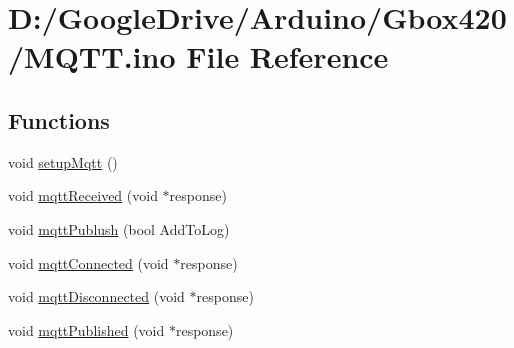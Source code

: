 \hypertarget{_m_q_t_t_8ino}{}\section{D\+:/\+Google\+Drive/\+Arduino/\+Gbox420/\+M\+Q\+TT.ino File Reference}
\label{_m_q_t_t_8ino}
\subsection*{Functions}
\begin{DoxyCompactItemize}
\item 
void \mbox{\hyperlink{_m_q_t_t_8ino_ad05a6aa6821baf0d8fe74cf150c3c57c}{setup\+Mqtt}} ()
\item 
void \mbox{\hyperlink{_m_q_t_t_8ino_a5817593b2815aca99b49db41903204d3}{mqtt\+Received}} (void $\ast$response)
\item 
void \mbox{\hyperlink{_m_q_t_t_8ino_ac3c091acc43bad71dff31c5b163db0d6}{mqtt\+Publush}} (bool Add\+To\+Log)
\item 
void \mbox{\hyperlink{_m_q_t_t_8ino_a01bcd10c2afc9c7b39c5da283353945b}{mqtt\+Connected}} (void $\ast$response)
\item 
void \mbox{\hyperlink{_m_q_t_t_8ino_acb866f89716f9272ccada4f9c9c7d09c}{mqtt\+Disconnected}} (void $\ast$response)
\item 
void \mbox{\hyperlink{_m_q_t_t_8ino_a9b7c7d96670d3bcde774877e8995d105}{mqtt\+Published}} (void $\ast$response)
\end{DoxyCompactItemize}
